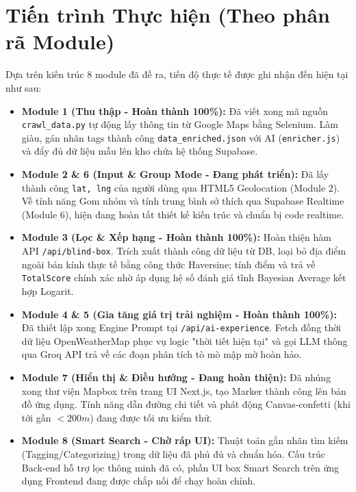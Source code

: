 \documentclass[12pt]{article}
\begin{document}
\section{Tiến trình Thực hiện (Theo phân rã Module)}
Dựa trên kiến trúc 8 module đã đề ra, tiến độ thực tế được ghi nhận đến hiện tại như sau:
\begin{itemize}
    \item \textbf{Module 1 (Thu thập - Hoàn thành 100\%):} Đã viết xong mã nguồn \texttt{crawl\_data.py} tự động lấy thông tin từ Google Maps bằng Selenium. Làm giàu, gán nhãn tags thành công \texttt{data\_enriched.json} với AI (\texttt{enricher.js}) và đẩy đủ dữ liệu mẫu lên kho chứa hệ thống Supabase.
    \item \textbf{Module 2 \& 6 (Input \& Group Mode - Đang phát triển):} Đã lấy thành công \texttt{lat, lng} của người dùng qua HTML5 Geolocation (Module 2). Về tính năng Gom nhóm và tính trung bình sở thích qua Supabase Realtime (Module 6), hiện đang hoàn tất thiết kế kiến trúc và chuẩn bị code realtime.
    \item \textbf{Module 3 (Lọc \& Xếp hạng - Hoàn thành 100\%):} Hoàn thiện hàm API \texttt{/api/blind-box}. Trích xuất thành công dữ liệu từ DB, loại bỏ địa điểm ngoài bán kính thực tế bằng công thức Haversine; tính điểm và trả về \texttt{TotalScore} chính xác nhờ áp dụng hệ số đánh giá tĩnh Bayesian Average kết hợp Logarit.
    \item \textbf{Module 4 \& 5 (Gia tăng giá trị trải nghiệm - Hoàn thành 100\%):} Đã thiết lập xong Engine Prompt tại \texttt{/api/ai-experience}. Fetch đồng thời dữ liệu OpenWeatherMap phục vụ logic "thời tiết hiện tại" và gọi LLM thông qua Groq API trả về các đoạn phân tích tò mò mập mờ hoàn hảo.
    \item \textbf{Module 7 (Hiển thị \& Điều hướng - Đang hoàn thiện):} Đã nhúng xong thư viện Mapbox trên trang UI Next.js, tạo Marker thành công lên bản đồ ứng dụng. Tính năng dẫn đường chi tiết và phát động Canvas-confetti (khi tới gần $< 200m$) đang được tối ưu kiểm thử.
    \item \textbf{Module 8 (Smart Search - Chờ ráp UI):} Thuật toán gắn nhãn tìm kiếm (Tagging/Categorizing) trong dữ liệu đã phủ đủ và chuẩn hóa. Cấu trúc Back-end hỗ trợ lọc thông minh đã có, phần UI box Smart Search trên ứng dụng Frontend đang được chắp nối để chạy hoàn chỉnh.
\end{itemize}

% 

% 
\end{document}
